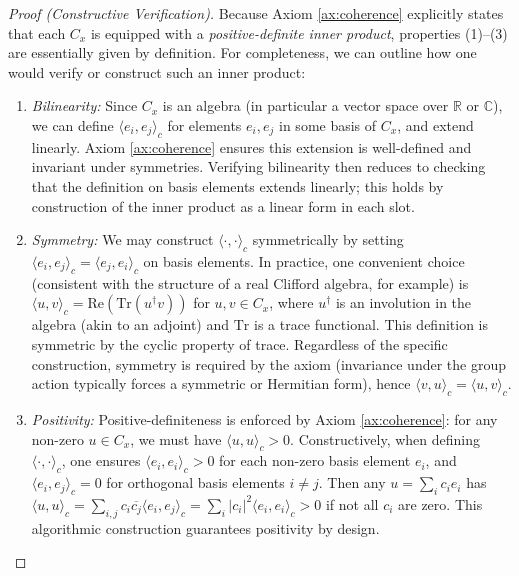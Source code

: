 \documentclass[11pt]{article}
\begin{document}
\begin{proof}[Proof (Constructive Verification)]
Because Axiom \ref{ax:coherence} explicitly states that each $C_x$ is equipped with a \emph{positive-definite inner product}, properties (1)--(3) are essentially given by definition. For completeness, we can outline how one would verify or construct such an inner product:

\begin{enumerate}
\item \emph{Bilinearity:} Since $C_x$ is an algebra (in particular a vector space over $\mathbb{R}$ or $\mathbb{C}$), we can define $\langle e_i, e_j\rangle_c$ for elements $e_i,e_j$ in some basis of $C_x$, and extend linearly. Axiom \ref{ax:coherence} ensures this extension is well-defined and invariant under symmetries. Verifying bilinearity then reduces to checking that the definition on basis elements extends linearly; this holds by construction of the inner product as a linear form in each slot.

\item \emph{Symmetry:} We may construct $\langle\cdot,\cdot\rangle_c$ symmetrically by setting $\langle e_i, e_j\rangle_c = \langle e_j, e_i\rangle_c$ on basis elements. In practice, one convenient choice (consistent with the structure of a real Clifford algebra, for example) is $\langle u, v\rangle_c = \mathrm{Re}(\mathrm{Tr}(u^\dagger v))$ for $u,v\in C_x$, where $u^\dagger$ is an involution in the algebra (akin to an adjoint) and $\mathrm{Tr}$ is a trace functional. This definition is symmetric by the cyclic property of trace. Regardless of the specific construction, symmetry is required by the axiom (invariance under the group action typically forces a symmetric or Hermitian form), hence $\langle v,u\rangle_c = \langle u,v\rangle_c$.

\item \emph{Positivity:} Positive-definiteness is enforced by Axiom \ref{ax:coherence}: for any non-zero $u\in C_x$, we must have $\langle u,u\rangle_c > 0$. Constructively, when defining $\langle\cdot,\cdot\rangle_c$, one ensures $\langle e_i, e_i\rangle_c > 0$ for each non-zero basis element $e_i$, and $\langle e_i, e_j\rangle_c = 0$ for orthogonal basis elements $i\neq j$. Then any $u = \sum_i c_i e_i$ has $\langle u,u\rangle_c = \sum_{i,j} c_i \overline{c_j}\langle e_i,e_j\rangle_c = \sum_i |c_i|^2 \langle e_i,e_i\rangle_c > 0$ if not all $c_i$ are zero. This algorithmic construction guarantees positivity by design.
\end{enumerate}


\end{proof}
\end{document}
